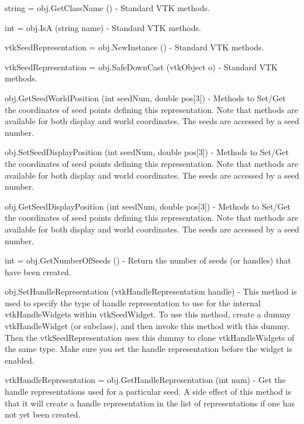 \begin{DoxyItemize}
\item {\ttfamily string = obj.\-Get\-Class\-Name ()} -\/ Standard V\-T\-K methods.  
\item {\ttfamily int = obj.\-Is\-A (string name)} -\/ Standard V\-T\-K methods.  
\item {\ttfamily vtk\-Seed\-Representation = obj.\-New\-Instance ()} -\/ Standard V\-T\-K methods.  
\item {\ttfamily vtk\-Seed\-Representation = obj.\-Safe\-Down\-Cast (vtk\-Object o)} -\/ Standard V\-T\-K methods.  
\item {\ttfamily obj.\-Get\-Seed\-World\-Position (int seed\-Num, double pos\mbox{[}3\mbox{]})} -\/ Methods to Set/\-Get the coordinates of seed points defining this representation. Note that methods are available for both display and world coordinates. The seeds are accessed by a seed number.  
\item {\ttfamily obj.\-Set\-Seed\-Display\-Position (int seed\-Num, double pos\mbox{[}3\mbox{]})} -\/ Methods to Set/\-Get the coordinates of seed points defining this representation. Note that methods are available for both display and world coordinates. The seeds are accessed by a seed number.  
\item {\ttfamily obj.\-Get\-Seed\-Display\-Position (int seed\-Num, double pos\mbox{[}3\mbox{]})} -\/ Methods to Set/\-Get the coordinates of seed points defining this representation. Note that methods are available for both display and world coordinates. The seeds are accessed by a seed number.  
\item {\ttfamily int = obj.\-Get\-Number\-Of\-Seeds ()} -\/ Return the number of seeds (or handles) that have been created.  
\item {\ttfamily obj.\-Set\-Handle\-Representation (vtk\-Handle\-Representation handle)} -\/ This method is used to specify the type of handle representation to use for the internal vtk\-Handle\-Widgets within vtk\-Seed\-Widget. To use this method, create a dummy vtk\-Handle\-Widget (or subclass), and then invoke this method with this dummy. Then the vtk\-Seed\-Representation uses this dummy to clone vtk\-Handle\-Widgets of the same type. Make sure you set the handle representation before the widget is enabled.  
\item {\ttfamily vtk\-Handle\-Representation = obj.\-Get\-Handle\-Representation (int num)} -\/ Get the handle representations used for a particular seed. A side effect of this method is that it will create a handle representation in the list of representations if one has not yet been created.  

\end{DoxyItemize}
